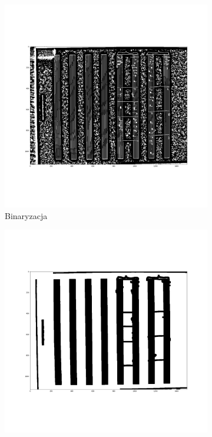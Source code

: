 \documentclass[12pt]{article}
\begin{document}
	\newpage
	\begin{figure}[h!]
		\centering
		\begin{subfigure}[b]{0.32\linewidth}
			\includegraphics[width=\linewidth]{zdj/Bin0.png}
			\caption{Binaryzacja}
		\end{subfigure}
		\begin{subfigure}[b]{0.32\linewidth}
			\includegraphics[width=\linewidth]{zdj/Bin1.png}

\end{subfigure}
\end{figure}
\end{document}
